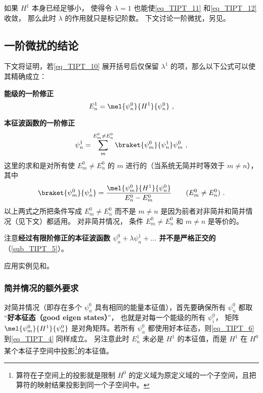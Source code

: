 如果 $H^1$ 本身已经足够小， 使得令 $\lambda = 1$ 也能使\autoref{eq_TIPT_11} 和\autoref{eq_TIPT_12} 收敛， 那么此时 $\lambda$ 的作用就只是标记阶数。 下文讨论一阶微扰，另见。

\subsection{一阶微扰的结论}
下文将证明，若\autoref{eq_TIPT_10} 展开括号后仅保留 $\lambda^1$ 的项，那么以下公式可以使其精确成立：

\textbf{能级的一阶修正}
\begin{equation}\label{eq_TIPT_6}
E_n^1 = \mel{\psi_n^0}{H^1}{\psi_n^0}~,
\end{equation}

\textbf{本征波函数的一阶修正}
\begin{equation}\label{eq_TIPT_5}
\psi_n^1 = \sum_m^{E_m^0 \ne E_n^0} \braket{\psi_m^0}{\psi_n^1} \psi_m^0~,
\end{equation}
这里的求和是对所有使 $E_m^0 \ne E_n^0$ 的 $m$ 进行的（当系统无简并时等效于 $m\ne n$）， 其中
\begin{equation}\label{eq_TIPT_4}
\braket{\psi_m^0}{\psi_n^1} = \frac{\mel{\psi_m^0}{H^1}{\psi_n^0}}{E_n^0 - E_m^0} \qquad (E_m^0 \ne E_n^0)~.
\end{equation}
以上两式之所把条件写成 $E_m^0 \ne E_n^0$ 而不是 $m \ne n$ 是因为前者对非简并和简并情况（见下文）都适用。 对非简并情况， 条件 $E_m^0 \ne E_n^0$ 和 $m \ne n$ 是等价的。

注意\textbf{经过有限阶修正的本征波函数 $\psi_n^0 + \lambda\psi_n^1 + \dots$ 并不是严格正交的}（\autoref{sub_TIPT_5}）。

应用实例见和。

\subsubsection{简并情况的额外要求}
对简并情况（即存在多个 $\psi_n^0$ 具有相同的能量本征值），首先要确保所有 $\psi_n^0$ 都取 “\textbf{好本征态（good eigen states）}”， 也就是对每一个能级的所有 $\psi_i^0$， 矩阵 $\mel{\psi_m^0}{H^1}{\psi_n^0}$ 是对角矩阵。若所有 $\psi_n^0$ 都使用好本征态，则\autoref{eq_TIPT_6} 到\autoref{eq_TIPT_4} 同样成立。 另注意此时 $E_n^1$ 未必是 $H^1$ 的本征值，而是 $H^1$ 在 $H^0$ 某个本征子空间中投影\footnote{算符在子空间上的投影就是限制 $H^0$ 的定义域为原定义域的一个子空间，且把算符的映射结果投影到同一个子空间中。}的本征值。

